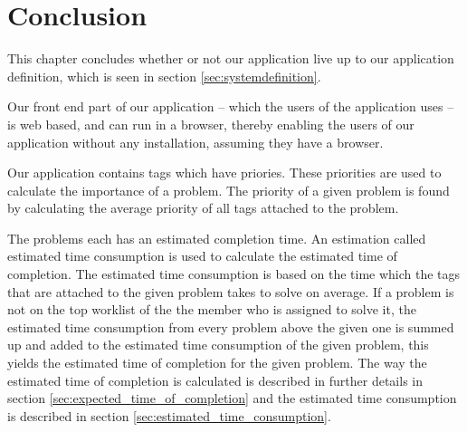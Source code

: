 \chapter{Conclusion}
\label{chap:conclusion}
This chapter concludes whether or not our application live up to our application definition, which is seen in section \ref{sec:systemdefinition}.

Our front end part of our application -- which the users of the application uses -- is web based, and can run in a browser, thereby enabling the users of our application without any installation, assuming they have a browser.

Our application contains tags which have priories.
These priorities are used to calculate the importance of a problem.
The priority of a given problem is found by calculating the average priority of all tags attached to the problem.

The problems each has an estimated completion time.
An estimation called estimated time consumption is used to calculate the estimated time of completion.
The estimated time consumption is based on the time which the tags that are attached to the given problem takes to solve on average.
If a problem is not on the top worklist of the the \astaff[] member who is assigned to solve it, the estimated time consumption from every problem above the given one is summed up and added to the estimated time consumption of the given problem, this yields the estimated time of completion for the given problem.
The way the estimated time of completion is calculated is described in further details in section \ref{sec:expected_time_of_completion} and the estimated time consumption is described in section \ref{sec:estimated_time_consumption}.











